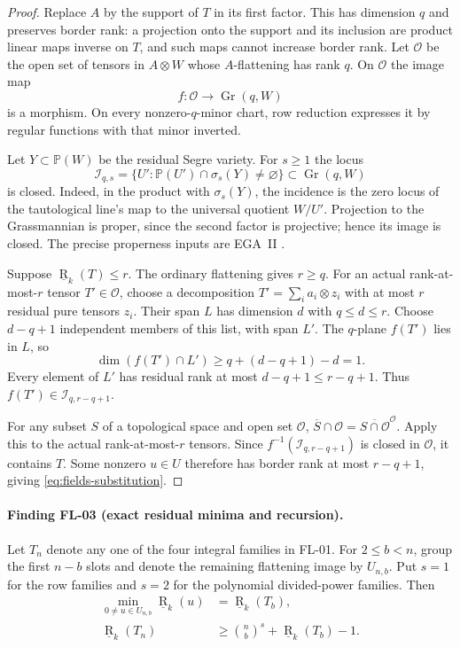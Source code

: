 \begin{proof}
Replace $A$ by the support of $T$ in its first factor. This has
dimension $q$ and preserves border rank: a projection onto the
support and its inclusion are product linear maps inverse on $T$,
and such maps cannot increase border rank. Let $\mathcal O$ be the
open set of tensors in $A\otimes W$ whose $A$-flattening has rank
$q$. On $\mathcal O$ the image map
\[
 f:\mathcal O\longrightarrow\operatorname{Gr}(q,W)
\]
is a morphism. On every nonzero-$q$-minor chart, row reduction
expresses it by regular functions with that minor inverted.

Let $Y\subset\mathbb P(W)$ be the residual Segre variety. For
$s\geq1$ the locus
\[
 \mathcal I_{q,s}=\{U':\mathbb P(U')\cap\sigma_s(Y)\ne\varnothing\}
 \subset\operatorname{Gr}(q,W)
\]
is closed. Indeed, in the product with $\sigma_s(Y)$, the incidence
is the zero locus of the tautological line's map to the universal
quotient $W/U'$. Projection to the Grassmannian is proper, since
the second factor is projective; hence its image is closed.
The precise properness inputs are EGA~II
\cite[Definition~5.4.1, Proposition~5.4.2, Theorem~5.5.3(i)]{EGA2}.

Suppose $\underline{\operatorname R}_k(T)\leq r$. The ordinary
flattening gives $r\geq q$. For an actual rank-at-most-$r$ tensor
$T'\in\mathcal O$, choose a decomposition
$T'=\sum_i a_i\otimes z_i$ with at most $r$ residual pure tensors
$z_i$. Their span $L$ has dimension $d$ with $q\leq d\leq r$.
Choose $d-q+1$ independent members of this list, with span $L'$.
The $q$-plane $f(T')$ lies in $L$, so
\[
 \dim(f(T')\cap L')\geq q+(d-q+1)-d=1.
\]
Every element of $L'$ has residual rank at most $d-q+1\leq r-q+1$.
Thus $f(T')\in\mathcal I_{q,r-q+1}$.

For any subset $S$ of a topological space and open set $\mathcal O$,
$\overline S\cap\mathcal O=\overline{S\cap\mathcal O}^{\mathcal O}$.
Apply this to the actual rank-at-most-$r$ tensors. Since
$f^{-1}(\mathcal I_{q,r-q+1})$ is closed in $\mathcal O$, it contains
$T$. Some nonzero $u\in U$ therefore has border rank at most
$r-q+1$, giving \eqref{eq:fields-substitution}.
\end{proof}

\paragraph{Finding FL-03 (exact residual minima and recursion).}
Let $T_n$ denote any one of the four integral families in FL-01.
For $2\leq b<n$, group the first $n-b$ slots and denote the
remaining flattening image by $U_{n,b}$. Put $s=1$ for the row
families and $s=2$ for the polynomial divided-power families.
Then
\begin{align}
 \min_{0\ne u\in U_{n,b}}\underline{\operatorname R}_k(u)
     &=\underline{\operatorname R}_k(T_b),\label{eq:fields-minimum}\\
 \underline{\operatorname R}_k(T_n)
     &\geq\binom nb^s+\underline{\operatorname R}_k(T_b)-1.
       \label{eq:fields-recursion}
\end{align}


